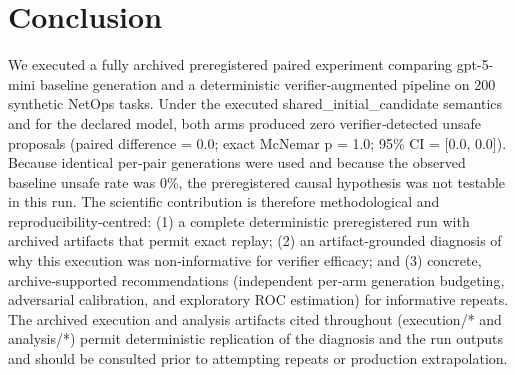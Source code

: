 \documentclass[conference]{IEEEtran}
\begin{document}
\section{Conclusion}
We executed a fully archived preregistered paired experiment comparing gpt-5-mini baseline generation and a deterministic verifier‑augmented pipeline on 200 synthetic NetOps tasks. Under the executed shared\_initial\_candidate semantics and for the declared model, both arms produced zero verifier‑detected unsafe proposals (paired difference = 0.0; exact McNemar p = 1.0; 95\% CI = [0.0, 0.0]). Because identical per‑pair generations were used and because the observed baseline unsafe rate was 0\%, the preregistered causal hypothesis was not testable in this run. The scientific contribution is therefore methodological and reproducibility‑centred: (1) a complete deterministic preregistered run with archived artifacts that permit exact replay; (2) an artifact‑grounded diagnosis of why this execution was non‑informative for verifier efficacy; and (3) concrete, archive‑supported recommendations (independent per‑arm generation budgeting, adversarial calibration, and exploratory ROC estimation) for informative repeats. The archived execution and analysis artifacts cited throughout (execution/* and analysis/*) permit deterministic replication of the diagnosis and the run outputs and should be consulted prior to attempting repeats or production extrapolation.
\end{document}
